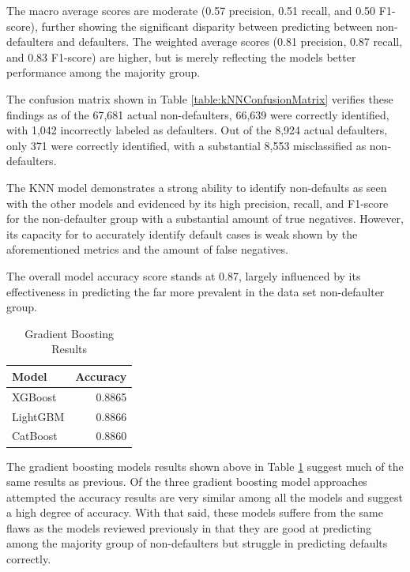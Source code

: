 \documentclass[12pt]{article}
\begin{document}
The macro average scores are moderate (0.57 precision, 0.51 recall, and 0.50 F1-score), further showing the significant disparity between predicting between non-defaulters and defaulters. The weighted average scores (0.81 precision, 0.87 recall, and 0.83 F1-score) are higher, but is merely reflecting the models better performance among the majority group.

The confusion matrix shown in Table \ref{table:kNNConfusionMatrix} verifies these findings as of the 67,681 actual non-defaulters, 66,639 were correctly identified, with 1,042 incorrectly labeled as defaulters. Out of the 8,924 actual defaulters, only 371 were correctly identified, with a substantial 8,553 misclassified as non-defaulters. 

The KNN model demonstrates a strong ability to identify non-defaults as seen with the other models and evidenced by its high precision, recall, and F1-score for the non-defaulter group with a substantial amount of true negatives. However, its capacity for to accurately identify default cases is weak shown by the aforementioned metrics and the amount of false negatives.

The overall model accuracy score stands at 0.87, largely influenced by its effectiveness in predicting the far more prevalent in the data set non-defaulter group. 

\begin{table}[htbp]
    \centering
    \caption{Gradient Boosting Results}
    \begin{tabular}{lr}
        \toprule
        Model & Accuracy \\
        \midrule
        XGBoost & 0.8865 \\
        LightGBM & 0.8866 \\
        CatBoost & 0.8860 \\
        \bottomrule
    \end{tabular}
    \label{table:gradientBoostingResults}
\end{table}

The gradient boosting models results shown above in Table \ref{table:gradientBoostingResults} suggest much of the same results as previous. Of the three gradient boosting model approaches attempted the accuracy results are very similar among all the models and suggest a high degree of accuracy. With that said, these models suffere from the same flaws as the models reviewed previously in that they are good at predicting among the majority group of non-defaulters but struggle in predicting defaults correctly.
\end{document}
